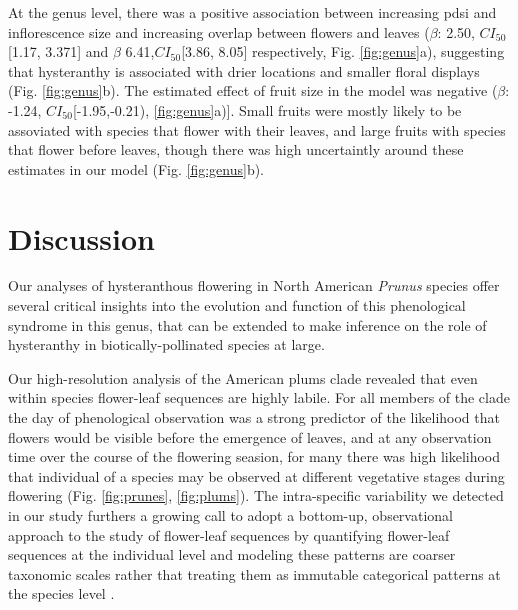 \documentclass{article}[11pt]
\begin{document}
At the genus level, there was a positive association between increasing pdsi and inflorescence size and increasing overlap between flowers and leaves  ($\beta$: 2.50, $CI_{50}$[1.17, 3.371] and $\beta$ 6.41,$CI_{50}$[3.86, 8.05] respectively, Fig. \ref{fig:genus}a), suggesting that hysteranthy is associated with drier locations and smaller floral displays (Fig. \ref{fig:genus}b). The estimated effect of fruit size in the model was negative ($\beta$: -1.24, $CI_{50}$[-1.95,-0.21), \ref{fig:genus}a)]. Small fruits were mostly likely to be assoviated with species that flower with their leaves, and large fruits with species that flower before leaves, though there was high uncertaintly around these estimates in our model (Fig. \ref{fig:genus}b). 

\section*{Discussion}
Our analyses of hysteranthous flowering in North American \emph{Prunus} species offer several critical insights into the evolution and function of this phenological syndrome in this genus, that can be extended to make inference on the role of hysteranthy in biotically-pollinated species at large.

Our high-resolution analysis of the American plums clade revealed that even within species flower-leaf sequences are highly labile. For all members of the clade the day of phenological observation was a strong predictor of the likelihood that flowers would be visible before the emergence of leaves, and at any observation time over the course of the flowering seasion,  for many there was high likelihood that individual of a species may be observed at different vegetative stages during flowering (Fig. \ref{fig:prunes}, \ref{fig:plums}). The intra-specific variability we detected in our study furthers a growing call to adopt a bottom-up, observational approach to the study of flower-leaf sequences by quantifying flower-leaf sequences  at the individual level and modeling these patterns are coarser taxonomic scales rather that treating them as immutable categorical patterns at the species level \citep{}.  
\end{document}
